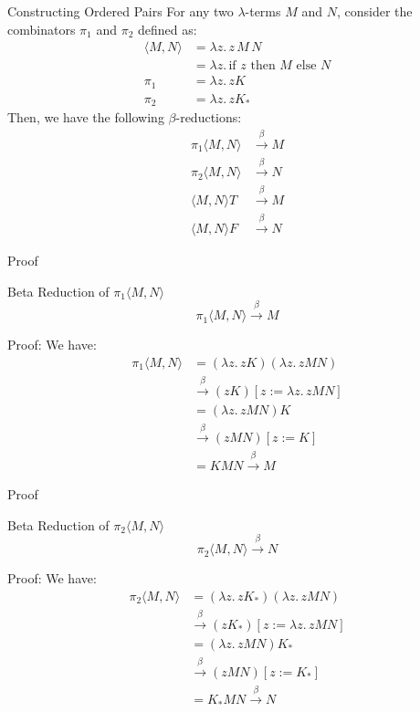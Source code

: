 \documentclass{beamer}
\begin{document}
\begin{frame}{Constructing Ordered Pairs}
  For any two \( \lambda \)-terms \( M \) and \( N \), consider the combinators \( \pi_1 \) and \( \pi_2 \) defined as:
  \begin{align*}
    \langle M, N \rangle &= \lambda z.\, z\, M\, N \\
    &= \lambda z.\, \text{if } z \text{ then } M \text{ else } N \\
    \pi_1 &= \lambda z.\, zK \\
    \pi_2 &= \lambda z.\, zK_*
  \end{align*}
  Then, we have the following \(\beta\)-reductions:
  \begin{align*}
    \pi_1 \langle M, N \rangle &\xrightarrow{\beta} M \\
    \pi_2 \langle M, N \rangle &\xrightarrow{\beta} N \\
    \langle M, N \rangle T &\xrightarrow{\beta} M \\
    \langle M, N \rangle F &\xrightarrow{\beta} N
  \end{align*}
\end{frame}
\begin{frame}{Proof}
  \begin{block}{Beta Reduction of \(\pi_1 \langle M, N \rangle\)}
    \[
      \pi_1 \langle M, N \rangle \xrightarrow{\beta} M
    \]
  \end{block}
  Proof:  
  We have:
  \begin{align*}
    \pi_1 \langle M, N \rangle &= (\lambda z.\, zK)(\lambda z.\, z M N) \\
    &\xrightarrow{\beta} (zK)[z := \lambda z.\, z M N] \\
    &= (\lambda z.\, z M N)K \\
    &\xrightarrow{\beta} (z M N)[z := K] \\
    &= K M N \xrightarrow{\beta} M
  \end{align*}
\end{frame}
\begin{frame}{Proof}
  \begin{block}{Beta Reduction of \(\pi_2 \langle M, N \rangle\)}
    \[
      \pi_2 \langle M, N \rangle \xrightarrow{\beta} N
    \]
  \end{block}
  Proof:  
  We have:
  \begin{align*}
    \pi_2 \langle M, N \rangle &= (\lambda z.\, zK_*)(\lambda z.\, z M N) \\
    &\xrightarrow{\beta} (zK_*)[z := \lambda z.\, z M N] \\
    &= (\lambda z.\, z M N)K_* \\
    &\xrightarrow{\beta} (z M N)[z := K_*] \\
    &= K_* M N \xrightarrow{\beta} N
  \end{align*}
\end{frame}
\end{document}
